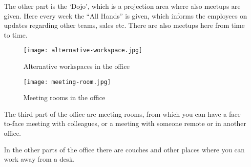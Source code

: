 The other part is the `Dojo', which is a projection area where also meetups are given. Here every week the ``All Hands'' is given, which informs the employees on updates regarding other teams, sales etc. There are also meetups here from time to time.

\begin{figure}[H]
\centering
\begin{minipage}{.5\textwidth}
  \centering
  \texttt{[image: alternative-workspace.jpg]}
  \caption{Alternative workspaces in the office}
  \label{figure:algolia-alternative-space}
\end{minipage}
\begin{minipage}{.5\textwidth}
  \centering
  \texttt{[image: meeting-room.jpg]}
  \caption{Meeting rooms in the office}
  \label{figure:algolia-meeting-rooms}
\end{minipage}
\end{figure}

The third part of the office are meeting rooms, from which you can have a face-to-face meeting with colleagues, or a meeting with someone remote or in another office.

In the other parts of the office there are couches and other places where you can work away from a desk.
